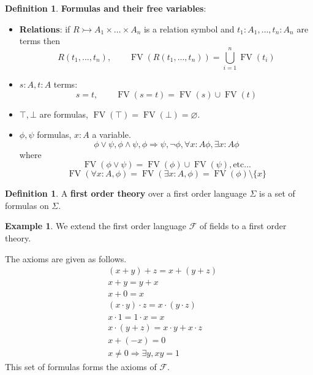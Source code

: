 \documentclass[12pt]{article}
\theoremstyle{plain}
\theoremstyle{definition}
\newtheorem{defn}[thm]{Definition} %
\newtheorem{example}[thm]{Example}
\newcommand{\call}[1]{\mathcal{#1}}
\begin{document}
\begin{defn}
	\textbf{Formulas and their free variables}:
	\begin{itemize}
		\item \textbf{Relations}: if $R \rightarrowtail A_1 \times \hdots \times A_n$ is a relation symbol and $t_1: A_1 , \hdots, t_n: A_n$ are terms then
		\begin{equation}
			R(t_1,...,t_n), \qquad \operatorname{FV}(R(t_1,...,t_n)) = \bigcup_{i = 1}^n \operatorname{FV}(t_i)
		\end{equation}
	\item $s:A,t:A$ terms:
	\begin{equation}
		s = t,\qquad \operatorname{FV}(s = t) = \operatorname{FV}(s) \cup \operatorname{FV}(t)
		\end{equation}
	\item $\top, \bot$ are formulas, $\operatorname{FV}(\top) = \operatorname{FV}(\bot) = \varnothing$.
	\item $\phi, \psi$ formulas, $x:A$ a variable.
	\begin{equation}
		\phi \vee \psi, \phi \wedge \psi, \phi \Rightarrow \psi, \neg \phi, \forall x:A \phi, \exists x:A \phi
		\end{equation}
	where
	\begin{equation}
		\operatorname{FV}(\phi \vee \psi) = \operatorname{FV}(\phi) \cup \operatorname{FV}(\psi), \text{etc}...
		\end{equation}
	\begin{equation}
		\operatorname{FV}(\forall x:A, \phi) = \operatorname{FV}(\exists x:A, \phi) =  \operatorname{FV}(\phi)\setminus\lbrace x\rbrace
		\end{equation}
	\end{itemize}
\end{defn}

\begin{defn}
	A \textbf{first order theory} over a first order language $\Sigma$ is a set of formulas on $\Sigma$.
\end{defn}

\begin{example}
	We extend the first order language $\call{F}$ of fields to a first order theory.
	
	The axioms are given as follows.
	\begin{align}
		&(x + y) + z = x + (y + z)\\
		&x + y = y + x\\
		&x + 0 = x\\
		&(x\cdot y)\cdot z = x \cdot (y \cdot z)\\
		&x \cdot 1 = 1 \cdot x = x\\
		&x\cdot (y + z) = x\cdot y + x \cdot z\\
		&x + (-x) = 0\\
		&x\neq 0 \Rightarrow \exists y, xy = 1
	\end{align}
	This set of formulas forms the axioms of $\call{F}$.
	\end{example}
\end{document}
